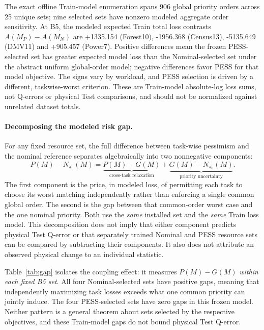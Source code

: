 \documentclass[sigconf, nonacm]{acmart}
\begin{document}
The exact offline Train-model enumeration spans
906 global priority orders across 25 unique sets;
nine selected sets have nonzero modeled aggregate
order sensitivity. At B5, the modeled expected
Train total loss contrasts \(A(M_P)-A(M_N)\)
are +1335.154 (Forest10), -1956.368 (Census13),
-5135.649 (DMV11) and +905.457 (Power7).
Positive differences mean the frozen PESS-selected set
has greater expected model loss than the Nominal-selected
set under the abstract uniform global-order model; negative
differences favor PESS for that model objective. The signs
vary by workload, and PESS selection is driven by a different,
taskwise-worst criterion. These are Train-model absolute-log
loss sums, not Q-errors or physical Test comparisons, and
should not be normalized against unrelated dataset totals.

\paragraph{Decomposing the modeled risk gap.}
For any fixed resource set, the full difference between
task-wise pessimism and the nominal reference separates
algebraically into two nonnegative components:
\begin{equation}
\label{eq:gap-decomposition}
P(M)-N_{\pi_0}(M)
=\underbrace{P(M)-G(M)}_{\text{cross-task relaxation}}
+\underbrace{G(M)-N_{\pi_0}(M)}_{\text{priority uncertainty}}.
\end{equation}
The first component is the price, in modeled loss,
of permitting each task to choose its worst matching
independently rather than enforcing a single common
global order. The second is the gap between that
common-order worst case and the one nominal priority.
Both use the \emph{same} installed set and the
\emph{same} Train loss model. This decomposition
does not imply that either component predicts
physical Test Q-error or that separately trained
Nominal and PESS resource sets can be compared by
subtracting their components. It also does not
attribute an observed physical change to an
individual statistic.

Table~\ref{tab:gap} isolates the coupling effect:
it measures \(P(M)-G(M)\) \emph{within each fixed B5 set}.
All four Nominal-selected sets have positive gaps,
meaning that independently maximizing task losses
exceeds what one common priority can jointly induce.
The four PESS-selected sets have zero gaps in this
frozen model. Neither pattern is a general theorem
about sets selected by the respective objectives,
and these Train-model gaps do not bound physical
Test Q-error.
\end{document}

